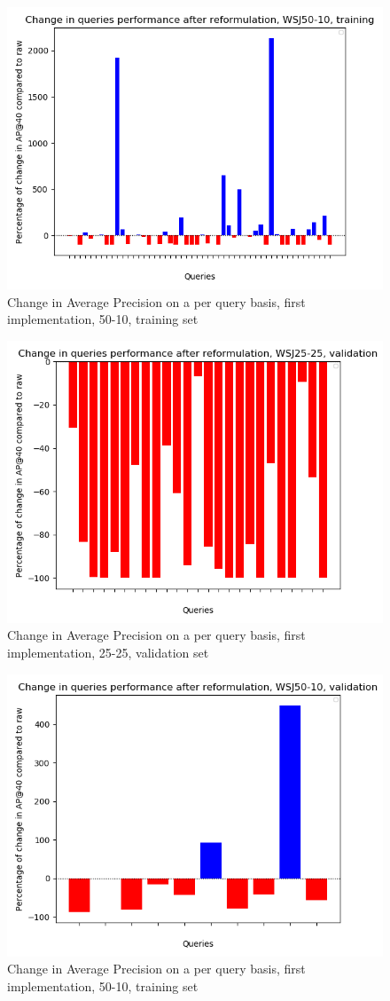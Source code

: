 \begin{figure}[H]
	\centering
	\includegraphics[width=0.7\linewidth]{images/chapter_4/first_system/per_query_improvment/50-10_train}
	\caption{Change in Average Precision on a per query basis, first implementation, 50-10, training set}
	\label{fig:50-10train}
\end{figure}



\begin{figure}[H]
	\centering
	\includegraphics[width=0.7\linewidth]{images/chapter_4/first_system/per_query_improvment/25-25_valid}
	\caption{Change in Average Precision on a per query basis, first implementation, 25-25, validation set}
	\label{fig:25-25valid}
\end{figure}

\begin{figure}[H]
	\centering
	\includegraphics[width=0.7\linewidth]{images/chapter_4/first_system/per_query_improvment/50-10_valid}
	\caption{Change in Average Precision on a per query basis, first implementation, 50-10, training set}
	\label{fig:50-10valid}
\end{figure}


